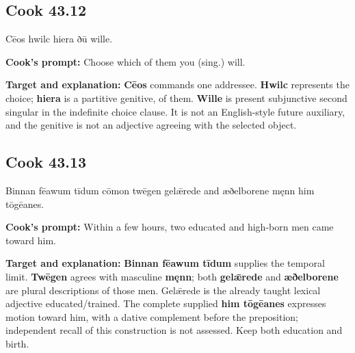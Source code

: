 \par\begin{minipage}{\linewidth}\raggedright
\subsection*{Cook 43.12}

Cēos hwilc hiera ðū wille.

\textbf{Cook's prompt:} Choose which of them you (sing.) will.

\textbf{Target and explanation:} \textbf{Cēos} commands one addressee. \textbf{Hwilc} represents the choice; \textbf{hiera} is a partitive genitive, of them. \textbf{Wille} is present subjunctive second singular in the indefinite choice clause. It is not an English-style future auxiliary, and the genitive is not an adjective agreeing with the selected object.

\end{minipage}\par\addvspace{4pt}

\par\begin{minipage}{\linewidth}\raggedright
\subsection*{Cook 43.13}

Binnan fēawum tīdum cōmon twēgen gelǣrede and æðelborene męnn him tōgēanes.

\textbf{Cook's prompt:} Within a few hours, two educated and high-born men came toward him.

\textbf{Target and explanation:} \textbf{Binnan fēawum tīdum} supplies the temporal limit. \textbf{Twēgen} agrees with masculine \textbf{męnn}; both \textbf{gelǣrede} and \textbf{æðelborene} are plural descriptions of those men. Gelǣrede is the already taught lexical adjective educated/\allowbreak{}trained. The complete supplied \textbf{him tōgēanes} expresses motion toward him, with a dative complement before the preposition; independent recall of this construction is not assessed. Keep both education and birth.

\end{minipage}\par\addvspace{4pt}

